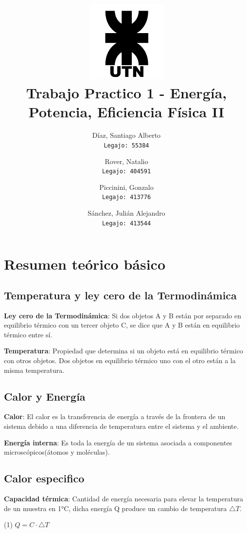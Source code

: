 \documentclass[]{article}
\title{\includegraphics[width=4cm]{UTN_logo.jpg}\\[2cm]Trabajo Practico 1 - Energía, Potencia, Eficiencia \textbf{Física II}}
\author{
	Díaz, Santiago Alberto\\
	\texttt{Legajo: 55384}
	\and
	Rover, Natalio\\
	\texttt{Legajo: 404591}
	\and
	Piccinini, Gonzalo\\
	\texttt{Legajo: 413776}
	\and
	Sánchez, Julián Alejandro\\
	\texttt{Legajo: 413544}
}
\begin{document}
\maketitle

\newpage
\section{Resumen teórico básico}

\subsection{Temperatura y ley cero de la Termodinámica}
\begin{flushleft}
	\textbf{Ley cero de la Termodinámica}: Si dos objetos A y B están por separado en equilibrio térmico con un tercer objeto C, se dice que A y B están en equilibrio térmico entre sí.
\end{flushleft}
\begin{flushleft}
	\textbf{Temperatura}: Propiedad que determina si un objeto está en equilibrio térmico con otros objetos. Dos objetos en equilibrio térmico uno con el otro están a la misma temperatura.
\end{flushleft}


\subsection{Calor y Energía}
\begin{flushleft}
	\textbf{Calor}: El calor es la transferencia de energía a través de la frontera de un sistema debido a una diferencia de temperatura entre el sistema y el ambiente.
\end{flushleft}

\begin{flushleft}
	\textbf{Energía interna}: Es toda la energía de un sistema asociada a componentes microscópicos(átomos y moléculas).
\end{flushleft}

\subsection{Calor especifico}
\begin{flushleft}
	\textbf{Capacidad térmica}: Cantidad de energía necesaria para elevar la temperatura de un muestra en 1°C, dicha energía Q produce un cambio de temperatura $\bigtriangleup T$. 
	
	\begin{center}
		(1) $Q = C \cdot \bigtriangleup T$
	\end{center}
\end{flushleft}
\end{document}
